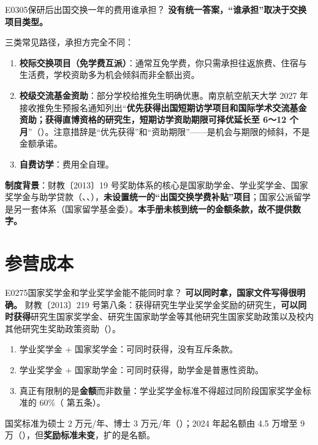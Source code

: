 \begin{qa}{E0305}{保研后出国交换一年的费用谁承担？}
\textbf{没有统一答案，“谁承担”取决于交换项目类型。}

三类常见路径，承担方完全不同：

\begin{enumerate}
  \item \textbf{校际交换项目（免学费互派）}：通常互免学费，你只需承担往返旅费、住宿与生活费，学校资助多为机会倾斜而非全额出资。
  \item \textbf{校级交流基金资助}：部分学校给推免生明确优惠。南京航空航天大学 2027 年接收推免生预报名通知列出“\textbf{优先获得出国短期访学项目和国际学术交流基金资助；获得直博资格的研究生，短期访学资助期限可择优延长至 6～12 个月}”（）。注意措辞是“优先获得”和“资助期限”——是机会与期限的倾斜，不是金额承诺。
  \item \textbf{自费访学}：费用全自理。
\end{enumerate}

\textbf{制度背景}：财教〔2013〕19 号奖助体系的核心是国家助学金、学业奖学金、国家奖学金与助学贷款（、、），\textbf{未设置统一的“出国交换学费补贴”项目}；国家公派留学是另一套体系（国家留学基金委）。\textbf{本手册未核到统一的金额条款，故不提供数字。}
\end{qa}

\section{参营成本}
\begin{qa}{E0275}{国家奖学金和学业奖学金能不能同时拿？}
\textbf{可以同时拿，国家文件写得很明确。} 财教〔2013〕219 号第八条：获得研究生学业奖学金奖励的研究生，\textbf{可以同时获得}研究生国家奖学金、研究生国家助学金等其他研究生国家奖助政策以及校内其他研究生奖助政策资助（）。

\begin{enumerate}
  \item 学业奖学金 + 国家奖学金：可同时获得，没有互斥条款。
  \item 学业奖学金 + 国家助学金：可同时获得，助学金是普惠性资助。
  \item 真正有限制的是\textbf{金额}而非数量：学业奖学金标准不得超过同阶段国家奖学金标准的 60\%（ 第五条）。
\end{enumerate}

国奖标准为硕士 2 万元/年、博士 3 万元/年（）；2024 年起名额由 4.5 万增至 9 万（），但\textbf{奖励标准未变}，扩的是名额。
\end{qa}

